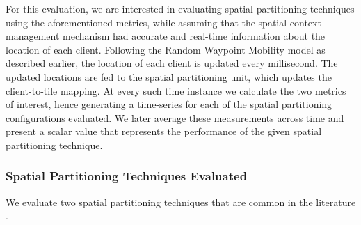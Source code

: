\par For this evaluation, we are interested in evaluating spatial partitioning techniques using the aforementioned metrics, while assuming that the spatial context management mechanism had accurate and real-time information about the location of each client. Following the Random Waypoint Mobility model as described earlier, the location of each client is updated every millisecond. The updated locations are fed to the spatial partitioning unit, which updates the client-to-tile mapping. At every such time instance we calculate the two metrics of interest, hence generating a time-series for each of the spatial partitioning configurations evaluated. We later average these measurements across time and present a scalar value that represents the performance of the given spatial partitioning technique.

\subsubsection{Spatial Partitioning Techniques Evaluated}
We evaluate two spatial partitioning techniques that are common in the literature \cite{mmog_kdtree, talkycars}.

